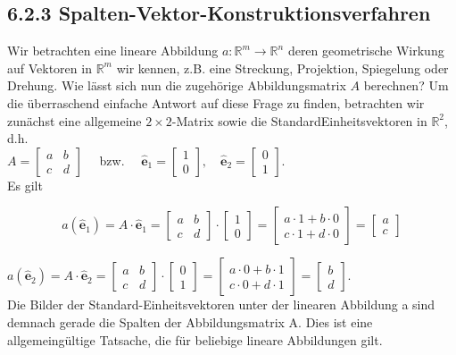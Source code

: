 \documentclass[10pt]{article}
\begin{document}
\subsection*{6.2.3 Spalten-Vektor-Konstruktionsverfahren}
Wir betrachten eine lineare Abbildung $a: \mathbb{R}^{m} \rightarrow \mathbb{R}^{n}$ deren geometrische Wirkung auf Vektoren in $\mathbb{R}^{m}$ wir kennen, z.B. eine Streckung, Projektion, Spiegelung oder Drehung. Wie lässt sich nun die zugehörige Abbildungsmatrix $A$ berechnen? Um die überraschend einfache Antwort auf diese Frage zu finden, betrachten wir zunächst eine allgemeine $2 \times 2$-Matrix sowie die StandardEinheitsvektoren in $\mathbb{R}^{2}$, d.h.\\
$A=\left[\begin{array}{ll}a & b \\ c & d\end{array}\right] \quad$ bzw. $\quad \hat{\mathbf{e}}_{1}=\left[\begin{array}{l}1 \\ 0\end{array}\right], \quad \hat{\mathbf{e}}_{2}=\left[\begin{array}{l}0 \\ 1\end{array}\right]$.\\
Es gilt

\[
a\left(\hat{\mathbf{e}}_{1}\right)=A \cdot \hat{\mathbf{e}}_{1}=\left[\begin{array}{ll}a & b  \tag{6.43}\\ c & d\end{array}\right] \cdot\left[\begin{array}{l}1 \\ 0\end{array}\right]=\left[\begin{array}{l}a \cdot 1+b \cdot 0 \\ c \cdot 1+d \cdot 0\end{array}\right]=\left[\begin{array}{l}a \\ c\end{array}\right]
\]

$a\left(\hat{\mathbf{e}}_{2}\right)=A \cdot \hat{\mathbf{e}}_{2}=\left[\begin{array}{ll}a & b \\ c & d\end{array}\right] \cdot\left[\begin{array}{l}0 \\ 1\end{array}\right]=\left[\begin{array}{l}a \cdot 0+b \cdot 1 \\ c \cdot 0+d \cdot 1\end{array}\right]=\left[\begin{array}{l}b \\ d\end{array}\right]$.\\
Die Bilder der Standard-Einheitsvektoren unter der linearen Abbildung a sind demnach gerade die Spalten der Abbildungsmatrix A. Dies ist eine allgemeingültige Tatsache, die für beliebige lineare Abbildungen gilt.
\end{document}
